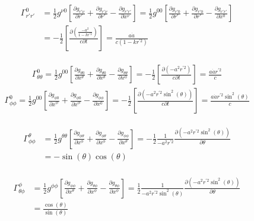 	\begin{gather*}
		\begin{aligned}
		\Gamma^{0}_{r' r'}&=\frac{1}{2} g^{\nu 0}\left[\frac{\partial g_{r'\nu}}{\partial r'}+\frac{\partial g_{r'\nu}}{\partial r'}-\frac{\partial g_{r'r'}}{\partial x^\nu}\right]=\frac{1}{2} g^{00}\left[\frac{\partial g_{r'0}}{\partial r'}+\frac{\partial g_{r'0}}{\partial r'}-\frac{\partial g_{r'r'}}{\partial x^0}\right]\\
		&=-\frac{1}{2}\left[\displaystyle\frac{\partial\left(\frac{-a^2}{1-k r^{'2}}\right)}{c\partial t}\right]=\frac{a\dot{a}}{c(1-k r^{'2})}
		\end{aligned}
	\end{gather*}
	
	\begin{gather*}
		\Gamma^0_{\theta\theta}=\frac{1}{2} g^{00}\left[\frac{\partial g_{\theta 0}}{\partial x^\theta}+\frac{\partial g_{\theta 0}}{\partial x^\theta}-\frac{\partial g_{\theta\theta}}{\partial x^0}\right]=-\frac{1}{2}\left[\frac{\partial(-a^2 r^{'2})}{c\partial t}\right]=\frac{a\dot{a} r^{'2}}{c}
	\end{gather*}
	\begin{gather*}
		\Gamma^0_{\phi\phi}=\frac{1}{2} g^{00}\left[\frac{\partial g_{\phi 0}}{\partial x^\phi}+\frac{\partial g_{\phi 0}}{\partial x^\phi}-\frac{\partial g_{\phi\phi}}{\partial x^0}\right]=-\frac{1}{2}\left[\frac{\partial(-a^2 r^{'2} \sin^2(\theta))}{c\partial t}\right]=\frac{a\dot{a} r^{'2}\sin^2(\theta)}{c}
	\end{gather*}
	
	\begin{gather*}
		\begin{aligned}
		\Gamma^\theta_{\phi\phi}&=\frac{1}{2} g^{\theta\theta}\left[\frac{\partial g_{\phi \theta}}{\partial x^\phi}+\frac{\partial g_{\phi \theta}}{\partial x^\phi}-\frac{\partial g_{\phi\phi}}{\partial x^\theta}\right]=-\frac{1}{2}\frac{1}{-a^2 r^{'2}} \frac{\partial(-a^2 r^{'2} \sin^2(\theta))}{\partial \theta}\\\
		&=-\sin(\theta)\cos(\theta)
		\end{aligned}
	\end{gather*}
	
	\begin{gather*}
		\begin{aligned}
		\Gamma^\phi_{\theta\phi}&=\frac{1}{2} g^{\phi\phi}\left[\frac{\partial g_{\phi \phi}}{\partial x^\theta}+\frac{\partial g_{\theta \phi}}{\partial x^\phi}-\frac{\partial g_{\theta\phi}}{\partial x^\phi}\right]=\frac{1}{2}\frac{1}{-a^2 r^{'2}\sin^2(\theta)} \frac{\partial(-a^2 r^{'2} \sin^2(\theta))}{\partial \theta}\\
		&=\frac{\cos(\theta)}{\sin(\theta)}
		\end{aligned}
	\end{gather*}
	
